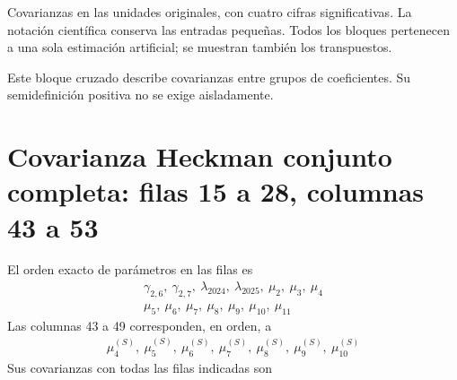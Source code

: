 \documentclass[11pt,a4paper]{article}
\begin{document}
Covarianzas en las unidades originales, con cuatro cifras significativas. La notación científica conserva las entradas pequeñas. Todos los bloques pertenecen a una sola estimación artificial; se muestran también los transpuestos.

Este bloque cruzado describe covarianzas entre grupos de coeficientes. Su semidefinición positiva no se exige aisladamente.

\clearpage
\section{Covarianza Heckman conjunto completa: filas 15 a 28, columnas 43 a 53}
El orden exacto de parámetros en las filas es
\[
\begin{gathered}\gamma_{2,6},\ \gamma_{2,7},\ \lambda_{2024},\ \lambda_{2025},\ \mu_2,\ \mu_3,\ \mu_4\\\mu_5,\ \mu_6,\ \mu_7,\ \mu_8,\ \mu_9,\ \mu_10,\ \mu_11\end{gathered}
\]
Las columnas 43 a 49 corresponden, en orden, a
\[
\begin{gathered}\mu_4^{(S)},\ \mu_5^{(S)},\ \mu_6^{(S)},\ \mu_7^{(S)},\ \mu_8^{(S)},\ \mu_9^{(S)},\ \mu_10^{(S)}\end{gathered}
\]
Sus covarianzas con todas las filas indicadas son
\end{document}
